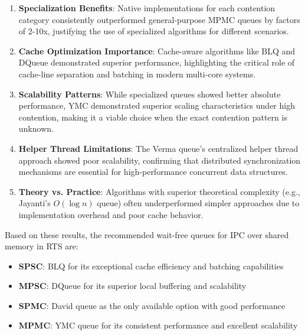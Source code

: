\begin{enumerate}
\item \textbf{Specialization Benefits}: Native implementations for each contention category consistently outperformed general-purpose \ac{MPMC} queues by factors of 2-10x, justifying the use of specialized algorithms for different scenarios.

\item \textbf{Cache Optimization Importance}: Cache-aware algorithms like \ac{BLQ} and DQueue demonstrated superior performance, highlighting the critical role of cache-line separation and batching in modern multi-core systems.

\item \textbf{Scalability Patterns}: While specialized queues showed better absolute performance, \ac{YMC} demonstrated superior scaling characteristics under high contention, making it a viable choice when the exact contention pattern is unknown.

\item \textbf{Helper Thread Limitations}: The Verma queue's centralized helper thread approach showed poor scalability, confirming that distributed synchronization mechanisms are essential for high-performance concurrent data structures.

\item \textbf{Theory vs. Practice}: Algorithms with superior theoretical complexity (e.g., Jayanti's $O(\log n)$ queue) often underperformed simpler approaches due to implementation overhead and poor cache behavior.
\end{enumerate}

Based on these results, the recommended wait-free queues for \ac{IPC} over shared memory in \ac{RTS} are:
\begin{itemize}
\item \textbf{SPSC}: \ac{BLQ} for its exceptional cache efficiency and batching capabilities
\item \textbf{MPSC}: DQueue for its superior local buffering and scalability
\item \textbf{SPMC}: David queue as the only available option with good performance
\item \textbf{MPMC}: \ac{YMC} queue for its consistent performance and excellent scalability
\end{itemize}
